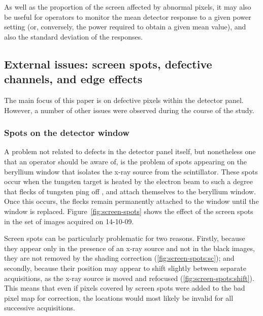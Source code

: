 \documentclass[\main/IO-Pixels.tex]{subfiles}
\begin{document}
As well as the proportion of the screen affected by abnormal pixels, it may also be useful for operators to monitor the mean detector response to a given power setting (or, conversely, the power required to obtain a given mean value), and also the standard deviation of the responses. 

\FloatBarrier
\subsection{External issues: screen spots, defective channels, and edge effects}
The main focus of this paper is on defective pixels within the detector panel. However, a number of other issues were observed during the course of the study.

\subsubsection{Spots on the detector window}
\label{sec:screen-spots}

A problem not related to defects in the detector panel itself, but nonetheless one that an operator should be aware of, is the problem of spots appearing on the beryllium window that isolates the x-ray source from the scintillator. These spots occur when the tungsten target is heated by the electron beam to such a degree that flecks of tungsten ping off , and attach themselves to the beryllium window. Once this occurs, the flecks remain permanently attached to the window until the window is replaced. Figure~\ref{fig:screen-spots} shows the effect of the screen spots in the set of images acquired on 14-10-09.

Screen spots can be particularly problematic for two reasons. Firstly, because they appear only in the presence of an x-ray source and not in the black images, they are not removed by the shading correction (\ref{fig:screen-spots:sc}); and secondly, because their position may appear to shift slightly between separate acquisitions, as the x-ray source is moved and refocused  (\ref{fig:screen-spots:shift}). This means that even if pixels covered by screen spots were added to the bad pixel map for correction, the locations would most likely be invalid for all successive acquisitions. 
\end{document}
